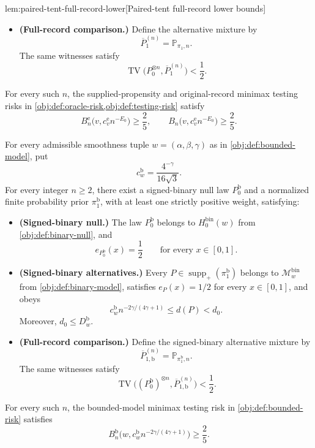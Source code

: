 \documentclass[11pt]{article}
\begin{document}
\begin{lemmav}{lem:paired-tent-full-record-lower}[Paired-tent full-record lower bounds]
\begin{itemize}
\item \textbf{(Full-record comparison.)}
Define the alternative mixture by
\[
\overline P_1^{(n)}=\mathbb P_{\pi_1,n}.
\]
The same witnesses satisfy
\[
\operatorname{TV}\bigl(P_0^{\otimes n},\overline P_1^{(n)}\bigr)<\frac12.
\]
\end{itemize}
For every such \(n\), the supplied-propensity and original-record minimax testing risks in \cref{obj:def:oracle-risk,obj:def:testing-risk} satisfy
\[
B_n^{\mathrm e}\bigl(v,c^{\mathrm e}_v n^{-E_0}\bigr)\ge\frac25,
\qquad
B_n\bigl(v,c^{\mathrm e}_v n^{-E_0}\bigr)\ge\frac25.
\]

For every admissible smoothness tuple \(w=(\alpha,\beta,\gamma)\) as in \cref{obj:def:bounded-model}, put
\[
c_w^{\mathrm b}=\frac{4^{-\gamma}}{16\sqrt3}.
\]
For every integer \(n\ge2\), there exist a signed-binary null law \(P_0^{\mathrm b}\) and a normalized finite probability prior \(\pi_1^{\mathrm b}\), with at least one strictly positive weight, satisfying:
\begin{itemize}
\item \textbf{(Signed-binary null.)}
The law \(P_0^{\mathrm b}\) belongs to \(H_0^{\mathrm{bin}}(w)\) from \cref{obj:def:binary-null}, and
\[
e_{P_0^{\mathrm b}}(x)=\frac12
\qquad\text{for every }x\in[0,1].
\]

\item \textbf{(Signed-binary alternatives.)}
Every \(P\in\operatorname{supp}_+(\pi_1^{\mathrm b})\) belongs to \(\mathcal M^{\mathrm{bin}}_w\) from \cref{obj:def:binary-model}, satisfies \(e_P(x)=1/2\) for every \(x\in[0,1]\), and obeys
\[
c_w^{\mathrm b}n^{-2\gamma/(4\gamma+1)}
\le d(P)<d_0.
\]
Moreover, \(d_0\le D_w^{\mathrm b}\).

\item \textbf{(Full-record comparison.)}
Define the signed-binary alternative mixture by
\[
\overline P_{1,\mathrm b}^{(n)}
=\mathbb P_{\pi_1^{\mathrm b},n}.
\]
The same witnesses satisfy
\[
\operatorname{TV}\bigl((P_0^{\mathrm b})^{\otimes n},
\overline P_{1,\mathrm b}^{(n)}\bigr)<\frac12.
\]
\end{itemize}
For every such \(n\), the bounded-model minimax testing risk in \cref{obj:def:bounded-risk} satisfies
\[
B_n^{\mathrm b}\bigl(w,c_w^{\mathrm b}n^{-2\gamma/(4\gamma+1)}\bigr)
\ge\frac25.
\]
\end{lemmav}
\end{document}
